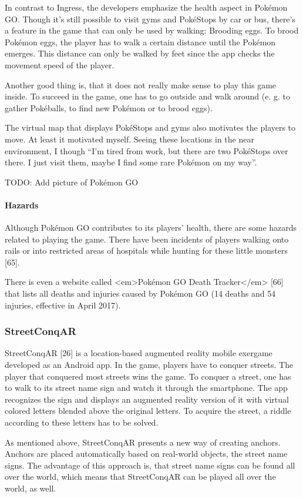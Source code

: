 In contrast to Ingress, the developers emphasize the health aspect in Pokémon GO. Though it’s still possible to visit gyms and PokéStops by car or bus, there’s a feature in the game that can only be used by walking: Brooding eggs. To brood Pokémon eggs, the player has to walk a certain distance until the Pokémon emerges. This distance can only be walked by feet since the app checks the movement speed of the player.

Another good thing is, that it does not really make sense to play this game inside. To succeed in the game, one has to go outside and walk around (e. g. to gather Pokéballs, to find new Pokémon or to brood eggs).

The virtual map that displays PokéStops and gyms also motivates the players to move. At least it motivated myself. Seeing these locations in the near environment, I though “I’m tired from work, but there are two PokéStops over there. I just visit them, maybe I find some rare Pokémon on my way”.

TODO: Add picture of Pokémon GO

\paragraph{Hazards}
Although Pokémon GO contributes to its players’ health, there are some hazards related to playing the game. There have been incidents of players walking onto rails or into restricted areas of hospitals while hunting for these little monsters [65].

There is even a website called <em>Pokémon GO Death Tracker</em> [66] that lists all deaths and injuries caused by Pokémon GO (14 deaths and 54 injuries, effective in April 2017).

\subsubsection{StreetConqAR}
StreetConqAR [26] is a location-based augmented reality mobile exergame developed as an Android app. In the game, players have to conquer streets. The player that conquered most streets wins the game. To conquer a street, one has to walk to its street name sign and watch it through the smartphone. The app recognizes the sign and displays an augmented reality version of it with virtual colored letters blended above the original letters. To acquire the street, a riddle according to these letters has to be solved.

As mentioned above, StreetConqAR presents a new way of creating anchors. Anchors are placed automatically based on real-world objects, the street name signs. The advantage of this approach is, that street name signs can be found all over the world, which means that StreetConqAR can be played all over the world, as well.

